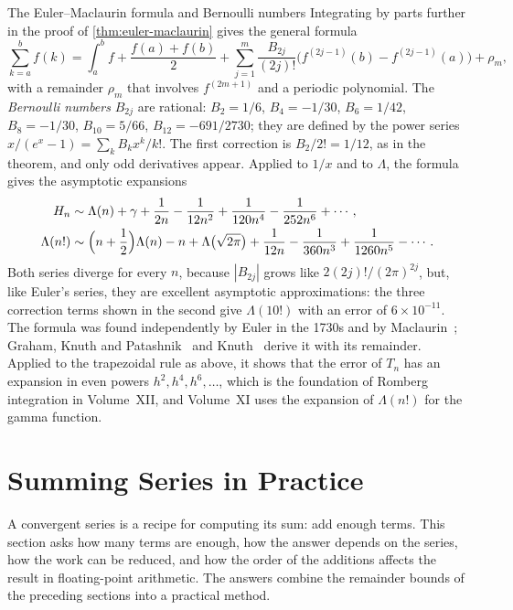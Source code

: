 \begin{note}{The Euler--Maclaurin formula and Bernoulli numbers}
Integrating by parts further in the proof of \cref{thm:euler-maclaurin} gives the general formula
\[
\sum_{k=a}^bf(k)=\int_a^bf+\frac{f(a)+f(b)}2+\sum_{j=1}^m\frac{B_{2j}}{(2j)!}\bigl(f^{(2j-1)}(b)-f^{(2j-1)}(a)\bigr)+\rho_m ,
\]
with a remainder $\rho_m$ that involves $f^{(2m+1)}$ and a periodic polynomial. The \emph{Bernoulli numbers} $B_{2j}$ are rational: $B_2=1/6$, $B_4=-1/30$, $B_6=1/42$, $B_8=-1/30$, $B_{10}=5/66$, $B_{12}=-691/2730$; they are defined by the power series $x/(e^x-1)=\sum_kB_kx^k/k!$. The first correction is $B_2/2!=1/12$, as in the theorem, and only odd derivatives appear. Applied to $1/x$ and to $\Lambda$, the formula gives the asymptotic expansions
\begin{align*}
H_n&\sim\Lambda(n)+\gamma+\frac1{2n}-\frac1{12n^2}+\frac1{120n^4}-\frac1{252n^6}+\cdots,\\
\Lambda(n!)&\sim\Bigl(n+\frac12\Bigr)\Lambda(n)-n+\Lambda\bigl(\sqrt{2\pi}\bigr)+\frac1{12n}-\frac1{360n^3}+\frac1{1260n^5}-\cdots .
\end{align*}
Both series diverge for every $n$, because $|B_{2j}|$ grows like $2(2j)!/(2\pi)^{2j}$, but, like Euler's series, they are excellent asymptotic approximations: the three correction terms shown in the second give $\Lambda(10!)$ with an error of $6\times10^{-11}$. The formula was found independently by Euler in the 1730s and by Maclaurin~\cite{maclaurin1742}; Graham, Knuth and Patashnik~\cite[Sect.~9.5]{graham1994concrete} and Knuth~\cite[Sect.~1.2.11.2]{knuth1997taocp1} derive it with its remainder. Applied to the trapezoidal rule as above, it shows that the error of $T_n$ has an expansion in even powers $h^2,h^4,h^6,\ldots$, which is the foundation of Romberg integration in Volume~XII, and Volume~XI uses the expansion of $\Lambda(n!)$ for the gamma function.
\end{note}

\section{Summing Series in Practice}
\label{sec:summing}

A convergent series is a recipe for computing its sum: add enough terms. This section asks how many terms are enough, how the answer depends on the series, how the work can be reduced, and how the order of the additions affects the result in floating-point arithmetic. The answers combine the remainder bounds of the preceding sections into a practical method.

